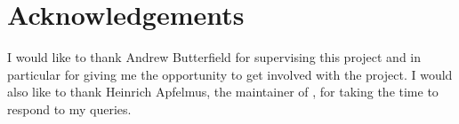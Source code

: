 \chapter*{Acknowledgements}

I would like to thank Andrew Butterfield for supervising this project and in
particular for giving me the opportunity to get involved with the \thp{}
project. I would also like to thank Heinrich Apfelmus, the maintainer of \thp{},
for taking the time to respond to my queries.
